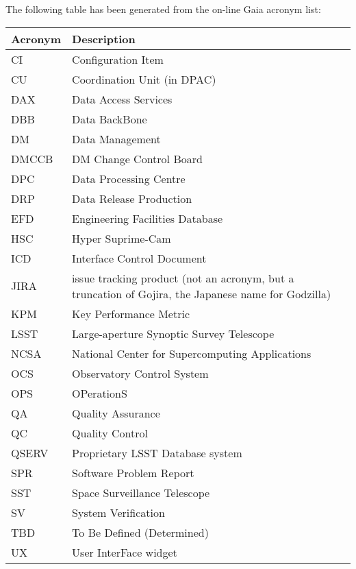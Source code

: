 The following table has been generated from the on-line Gaia acronym list:
\newline\newline%
\addtocounter{table}{-1}
\begin{longtable}{|l|p{}|}\hline 
\textbf{Acronym} & \textbf{Description}  \\\hline
CI&Configuration Item \\\hline
CU&Coordination Unit (in DPAC) \\\hline
DAX&Data Access Services \\\hline
DBB&Data BackBone \\\hline
DM&Data Management \\\hline
DMCCB&DM Change Control Board \\\hline
DPC&Data Processing Centre \\\hline
DRP&Data Release Production \\\hline
EFD&Engineering Facilities Database \\\hline
HSC&Hyper Suprime-Cam \\\hline
ICD&Interface Control Document \\\hline
JIRA&issue tracking product (not an acronym, but a truncation of Gojira, the Japanese name for Godzilla) \\\hline
KPM&Key Performance Metric \\\hline
LSST&Large-aperture Synoptic Survey Telescope \\\hline
NCSA&National Center for Supercomputing Applications \\\hline
OCS&Observatory Control System \\\hline
OPS&OPerationS \\\hline
QA&Quality Assurance \\\hline
QC&Quality Control \\\hline
QSERV&Proprietary LSST Database system \\\hline
SPR&Software Problem Report \\\hline
SST&Space Surveillance Telescope \\\hline
SV&System Verification \\\hline
TBD&To Be Defined (Determined) \\\hline
UX&User InterFace widget \\\hline
\end{longtable} 

